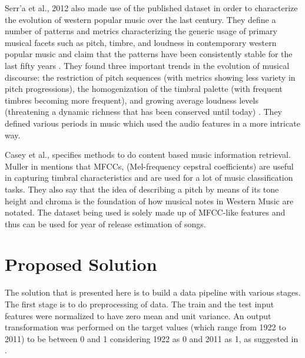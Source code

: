 \documentclass{article} %
\begin{document}
Serr'a et al., 2012 also made use of the published dataset in order to characterize the evolution of western popular music over the last century. They define a number of patterns and metrics characterizing the generic usage of primary musical facets such as pitch, timbre, and loudness in contemporary western popular music and claim that the patterns have been consistently stable for the last fifty years \cite{serra}. They found three important trends in the evolution of musical discourse: the restriction of pitch sequences (with metrics showing less variety in pitch progressions), the homogenization of the timbral palette (with frequent timbres becoming more frequent), and growing average loudness levels (threatening a dynamic richness that has been conserved until today) \cite{serra}. They defined various periods in music which used the audio features in a more intricate way. 

Casey et al., \cite{casey} specifies methods to do content based music information retrieval. Muller in \cite{inforet}  mentions that MFCCs, (Mel-frequency cepstral coefficients) are useful in capturing timbral characteristics and are used for a lot of music classification tasks. They also say that the idea of describing a pitch by means of its tone height and chroma is the foundation of how musical notes in Western Music are notated. The dataset being used is solely made up of MFCC-like features and thus can be used for year of release estimation of songs.  

\section{Proposed Solution}
The solution that is presented here is to build a data pipeline with various stages. The first stage is to do preprocessing of data. The train and the test input features were normalized to have zero mean and unit variance. An output transformation was performed on the target values (which range from 1922 to 2011) to be between 0 and 1 considering 1922 as 0 and 2011 as 1, as suggested in \cite{msd_11}. 
\end{document}
